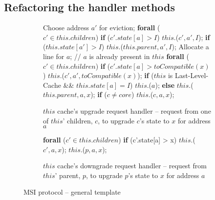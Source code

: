 \subsection{Refactoring the handler methods}
\begin{figure}
\small

\begin{subfigure}{\linewidth}
\begin{boxedminipage}{\linewidth}
\begin{algorithmic}
        \State Choose address $a'$ for eviction;
        \State \textbf{forall} ($c' \in this.children$)
        \State \;\;\;\; \textbf{if} ($c'.state[a] > I$)
        \State \;\;\;\;\;\;\;\; \call{} $this.$\dReqL($c', a', I$);
        \State \textbf{if} ($this.state[a'] > I$)
        \State \;\;\;\; \call{} $this.$\dResp{}($this.parent, a', I$);
      \EndIf
      \State Allocate a line for $a$;
    \EndIf
    \State // $a$ is already present in $this$
    \State \textbf{forall} ($c' \in this.children$)
    \State \;\;\;\; \textbf{if} ($c'.state[a] > toCompatible(x)$)
    \State \;\;\;\;\;\;\;\; \call{} $this.$\dReqL($c', a', toCompatible(x)$);
    \State \textbf{if} ($this$ is Last-Level-Cache \&\& $this.state[a] = I$)
    \State \;\;\;\; \call{} $this$.\sendMem{}($a$);
    \State \textbf{else}
    \State \;\;\;\; \call{} $this.$\uReqL{}($this.parent, a, x$);
  \State \textbf{if} ($c \neq core$)
  \State \;\;\;\; \call{} $this$.\uResp{}($c, a, x$);
\EndProc
\end{algorithmic}
\end{boxedminipage}
\caption{$this$ cache's upgrade request handler -- request from one of $this$' children, $c$, to upgrade $c$'s state to $x$ for address $a$ }
\label{atomicUReq1}
\end{subfigure}

\begin{subfigure}{\linewidth}
\begin{boxedminipage}{\linewidth}
\begin{algorithmic}
    \State \textbf{forall} ($c' \in this.children$)
    \State \;\;\;\; \textbf{if} (c'.state[a] > x)
    \State \;\;\;\;\;\;\;\; \call{} $this.$\dReqL($c', a, x$);
    \State \call{} $this.$\dResp($p, a, x$);
  \EndIf
\EndProc
\end{algorithmic}
\end{boxedminipage}
\caption{$this$ cache's downgrade request handler -- request from $this$'
parent, $p$, to upgrade $p$'s state to $x$ for address $a$ }
\label{atomicDReq1}
\end{subfigure}

\caption{MSI protocol -- general template}
\label{msi-template}
\end{figure}

